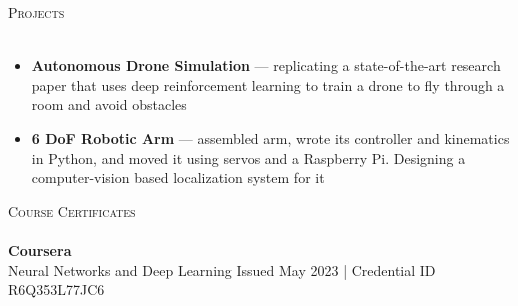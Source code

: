 \documentclass[a4paper]{article}
\newcommand{\lineunder} {
    \vspace*{-8pt} \\
    \hspace*{-18pt} \hrulefill \\
}
\newcommand{\header} [1] {
    {\hspace*{-18pt}\vspace*{6pt} \textsc{#1}}
    \vspace*{-6pt} \lineunder
}
\begin{document}
\header{Projects}
\vspace{-1mm}
\begin{itemize} \itemsep 1pt
    \item \textbf{Autonomous Drone Simulation} --- replicating a state-of-the-art research paper that uses deep reinforcement
    learning to train a drone to fly through a room and avoid obstacles
    \item \textbf{6 DoF Robotic Arm} --- assembled arm, wrote its controller and kinematics in Python, and moved it using servos and a Raspberry Pi. Designing a computer-vision based localization system for it
\end{itemize}

\header{Course Certificates}
{\textbf{Coursera}}\\
\vspace{1.75mm}
Neural Networks and Deep Learning \hfill Issued May 2023 | \footnotesize{Credential ID R6Q353L77JC6}
\end{document}
